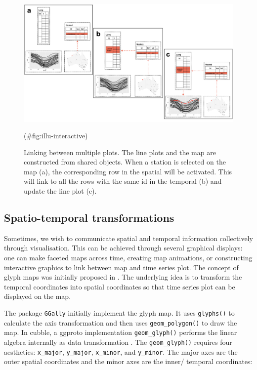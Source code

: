 \documentclass[
]{jss}
\begin{document}
\begin{CodeChunk}
\begin{figure}

{\centering \includegraphics[width=1\linewidth,height=0.35\textheight]{figures/diagram-keynotes/diagram-keynotes.002} 

}

\caption{Linking between multiple plots. The line plots and the map are constructed from shared  objects. When a station is selected on the map (a), the corresponding row in the spatial  will be activated. This will link to all the rows with the same id in the temporal  (b) and update the line plot (c).}(\#fig:illu-interactive)
\end{figure}
\end{CodeChunk}

\hypertarget{st_transformation}{%
\subsection{Spatio-temporal transformations}\label{st_transformation}}

Sometimes, we wish to communicate spatial and temporal information
collectively through visualisation. This can be achieved through several
graphical displays: one can make faceted maps across time, creating map
animations, or constructing interactive graphics to link between map and
time series plot. The concept of glyph maps was initially proposed in
\citet{Wickham2012-yr}. The underlying idea is to transform the temporal
coordinates into spatial coordinates so that time series plot can be
displayed on the map.

The package \texttt{GGally} initially implement the glyph map. It uses
\texttt{glyphs()} to calculate the axis transformation and then uses
\texttt{geom\_polygon()} to draw the map. In cubble, a ggproto
implementation \texttt{geom\_glyph()} performs the linear algebra
internally as data transformation . The \texttt{geom\_glyph()} requires
four aesthetics: \texttt{x\_major}, \texttt{y\_major},
\texttt{x\_minor}, and \texttt{y\_minor}. The major axes are the outer
spatial coordinates and the minor axes are the inner/ temporal
coordinates:
\end{document}
